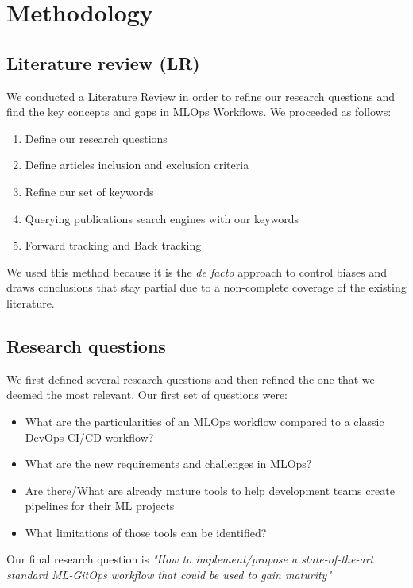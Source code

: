 \section{Methodology}\label{sec:methodo}
\subsection{Literature review (LR)}\label{subsec:literature-review-(lr)}

We conducted a Literature Review in order to refine our research questions and find the key concepts and gaps in MLOps Workflows.
We proceeded as follows:

\begin{enumerate}
    \item Define our research questions
    \item Define articles inclusion and exclusion criteria
    \item Refine our set of keywords
    \item Querying publications search engines with our keywords
    \item Forward tracking and Back tracking
\end{enumerate}

We used this method because it is the \textit{de facto} approach to control biases and draws conclusions that stay partial due to
a non-complete coverage of the existing literature.

\subsection{Research questions}\label{subsec:research-questions}

We first defined several research questions and then refined the one that we deemed the most relevant.
Our first set of questions were:
\begin{itemize}
    \item What are the particularities of an MLOps workflow compared to a classic DevOps CI/CD workflow?
    \item What are the new requirements and challenges in MLOps?
    \item Are there/What are already mature tools to help development teams create pipelines for their ML projects
    \item What limitations of those tools can be identified?
\end{itemize}

Our final research question is
\textit{"How to implement/propose a state-of-the-art standard ML-GitOps workflow that could be used to gain maturity"\cite{mlops-definition-tools-and-challenge,mlops-maturity-model}}

